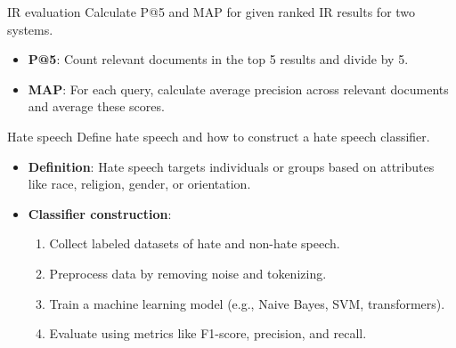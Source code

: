 \documentclass{article}
\begin{document}
\begin{exercise}{IR evaluation}
  Calculate P@5 and MAP for given ranked IR results for two systems.

  \begin{solution}
    \begin{itemize}
        \item \textbf{P@5}: Count relevant documents in the top 5 results and divide by 5.
        \item \textbf{MAP}: For each query, calculate average precision across relevant documents and average these scores.
    \end{itemize}
  \end{solution}
\end{exercise}

\begin{exercise}{Hate speech}
  Define hate speech and how to construct a hate speech classifier.

  \begin{solution}
    \begin{itemize}
        \item \textbf{Definition}: Hate speech targets individuals or groups based on attributes like race, religion, gender, or orientation.
        \item \textbf{Classifier construction}:
        \begin{enumerate}
            \item Collect labeled datasets of hate and non-hate speech.
            \item Preprocess data by removing noise and tokenizing.
            \item Train a machine learning model (e.g., Naive Bayes, SVM, transformers).
            \item Evaluate using metrics like F1-score, precision, and recall.
        \end{enumerate}
    \end{itemize}
  \end{solution}
\end{exercise}
\end{document}
